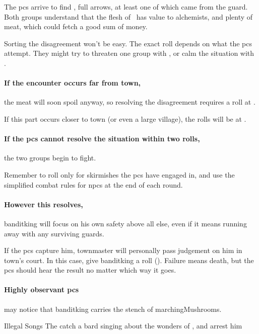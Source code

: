 The \glspl{pc} arrive to find \localMonster, full arrows, at least one of which came from the \gls{guard}.
Both groups understand that the flesh of \localMonster\ has value to alchemists, and plenty of meat, which could fetch a good sum of money.

Sorting the disagreement won't be easy.
The exact roll depends on what the \glspl{pc} attempt.
They might try to threaten one group with , or calm the situation with .

\paragraph{If the encounter occurs far from \gls{town},}
the meat will soon spoil anyway, so resolving the disagreement requires a roll at \tn[9].

If this part occurs closer to \gls{town} (or even a large \gls{village}), the rolls will be at \tn[12].

\paragraph{If the \glspl{pc} cannot resolve the situation within two rolls,}
the two groups begin to fight.

Remember to roll only for skirmishes the \glspl{pc} have engaged in, and use the simplified combat rules for \glspl{npc} at the end of each round.%

\paragraph{However this resolves,}
\gls{banditking} will focus on his own safety above all else, even if it means running away with any surviving guards.

If the \glspl{pc} capture him, \gls{townmaster} will personally pass judgement on him in \gls{town}'s \gls{court}.
In this case, give \gls{banditking} a  roll (\tn[8]).
Failure means death, but the \glspl{pc} should hear the result no matter which way it goes.

\paragraph{Highly observant \glspl{pc}}
may notice that \gls{banditking} carries the stench of \glspl{marchingMushroom}.


{Illegal Songs}%
{The  catch a bard singing about the wonders of , and arrest him}%


